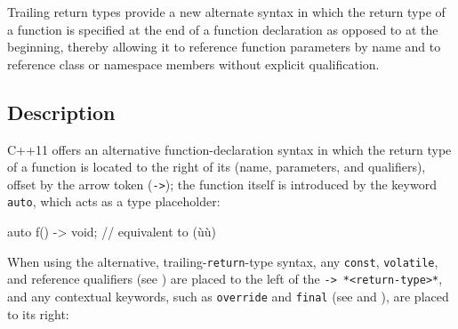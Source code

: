 
Trailing return types provide a new alternate syntax in which the return type of a function is specified at
the end of a function declaration as opposed to at the beginning,
thereby allowing it to reference function parameters by name and to reference class
or namespace members without explicit qualification.

\subsection[Description]{Description}\label{description}

C++11 offers an alternative function-declaration syntax in which the
return type of a function is located to the right of its
 (name, parameters, and qualifiers), offset by the
arrow token (\lstinline!->!); the function itself is introduced by the
keyword \lstinline!auto!, which acts as a type placeholder:
%

\begin{emcppslisting}
auto f() -> void;  // equivalent to (ù{}ù)
\end{emcppslisting}

When using the alternative, trailing-\lstinline!return!-type syntax, any \lstinline!const!,
\lstinline!volatile!, and reference qualifiers (see
) are placed to the left of
the \lstinline!->!~\lstinline!*<return-type>*!, and any contextual keywords, such as
\lstinline!override! and \lstinline!final! (see
and
), are placed to its right:

